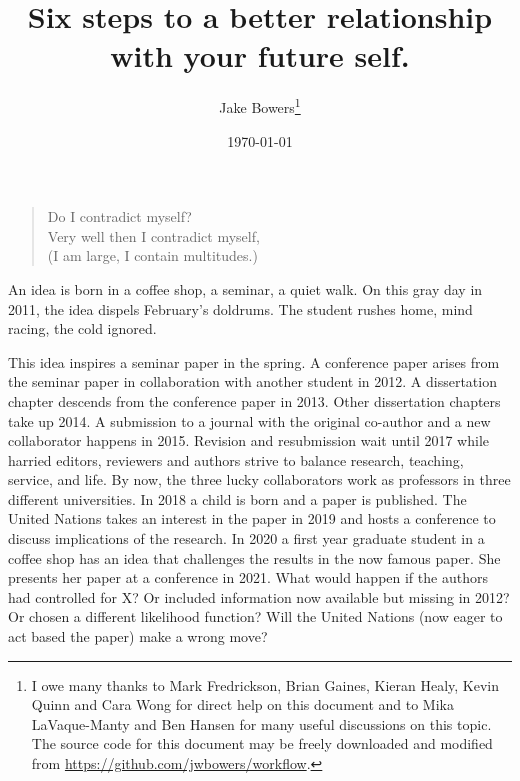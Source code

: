 \documentclass[12pt]{article}
\title{Six steps to a better relationship with your future self.}
\author{Jake Bowers\thanks{I owe many thanks to Mark Fredrickson,
    Brian Gaines, Kieran Healy, Kevin Quinn and Cara
    Wong for direct help on this document and to Mika LaVaque-Manty
    and Ben Hansen for many useful discussions on this topic. The
    source code for this document may be freely downloaded and
    modified from \url{https://github.com/jwbowers/workflow}.}}
\date{\today}
\begin{document}
\frenchspacing
\VerbatimFootnotes
\maketitle




\begin{verse}
Do I contradict myself? \\
Very well then I contradict myself, \\
(I am large, I contain multitudes.) \\
\citep{whitman1855song}
\end{verse}

An idea is born in a coffee shop, a seminar, a quiet walk. On this
gray day in 2011, the idea dispels February's doldrums. The student
rushes home, mind racing, the cold ignored.

This idea inspires a seminar paper in the spring. A conference paper
arises from the seminar paper in collaboration with another student in
2012. A dissertation chapter descends from the conference paper in
2013. Other dissertation chapters take up 2014. A submission to a
journal with the original co-author and a new collaborator happens in
2015. Revision and resubmission wait until 2017 while harried editors,
reviewers and authors strive to balance research, teaching, service,
and life. By now, the three lucky collaborators work as professors in
three different universities. In 2018 a child is born and a paper is
published. The United Nations takes an interest in the paper in 2019
and hosts a conference to discuss implications of the research. In
2020 a first year graduate student in a coffee shop has an idea that
challenges the results in the now famous paper. She presents her paper
at a conference in 2021. What would happen if the authors had
controlled for X? Or included information now available but missing in
2012?  Or chosen a different likelihood function?  Will the United
Nations (now eager to act based the paper) make a wrong move?
\end{document}
